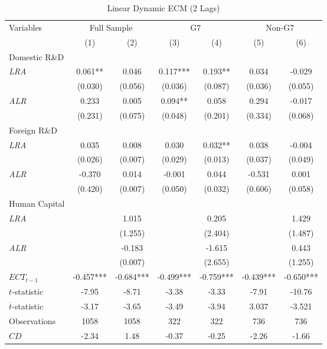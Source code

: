 \documentclass[12pt]{article}
\begin{document}
\begin{table}[htbp!]
    \centering
    \doublespacing
      \setlength{\tabcolsep}{0.75pt} 
        \caption{Linear Dynamic ECM (2 Lags)}
            \fontsize{11}{12}\selectfont
  \begin{tabular*}{\textwidth}{@{\extracolsep{\fill}}l*{6}{c}}
    \hline
    Variables & \multicolumn{2}{c}{Full Sample} & \multicolumn{2}{c}{G7} & \multicolumn{2}{c}{Non-G7} \\
    \cmidrule(lr){2-7}
        & (1)  & (2) & (3) & (4) & (5) & (6)  \\
         \hline
        Domestic R\&D  \\
       \textit{LRA} & 0.061** & 0.046  & 0.117***  & 0.193** & 0.034 & -0.029 \\
         & (0.030)  & (0.056) &  (0.036) & (0.087) & (0.036) & (0.055) \\
         \textit{ALR} & 0.233 & 0.005  & 0.094** & 0.058 & 0.294 & -0.017  \\
         & (0.231)  & (0.075) & (0.048)  & (0.201) & (0.334) & (0.068) \\
        Foreign R\&D  \\
        \textit{LRA} & 0.035 & 0.008 & 0.030 & 0.032**  & 0.038 & -0.004 \\
         & (0.026) & (0.007) & (0.029) & (0.013) & (0.037) & (0.049) \\
        \textit{ALR} & -0.370 & 0.014 & -0.001 & 0.044 &  -0.531 & 0.001\\
         & (0.420) & (0.007) & (0.050) & (0.032) &  (0.606) & (0.058) \\
         Human Capital\\
         \textit{LRA} &  & 1.015 &  & 0.205 &  & 1.429 \\
         &  & (1.255) &  & (2.404) &  & (1.487) \\
        \textit{ALR} &  & -0.183 &  & -1.615 & & 0.443 \\
         & & (0.007) &  & (2.655)  & & (1.255) \\
        $ECT_{t-1}$ & -0.457*** & -0.684*** & -0.499*** & -0.759***  & -0.439*** & -0.650***\\
         $t$-statistic & -7.95 & -8.71 & -3.38 & -3.33 & -7.91 & -10.76 \\
         $\overline{t}$-statistic & -3.17 & -3.65 & -3.49 & -3.94 & 3.037 & -3.521 \\
         \hline
         Observations& 1058 &  1058 & 322 & 322 & 736 & 736 \\
         $CD$& -2.34 & 1.48 & -0.37 & -0.25 & -2.26 & -1.66 \\

\end{tabular*}
\end{table}
\end{document}
